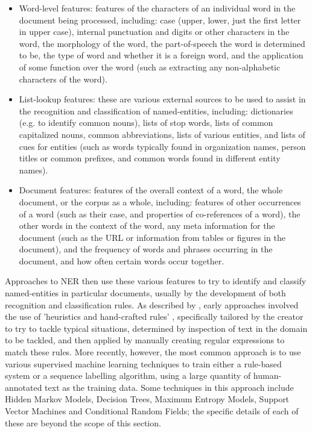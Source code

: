 \documentclass[12pt, a4paper]{report}
\begin{document}
\begin{itemize}
	\item {Word-level features: features of the characters of an individual word in the document being processed, including: case (upper, lower, just the first letter in upper case), internal punctuation and digits or other characters in the word, the morphology of the word, the part-of-speech the word is determined to be, the type of word and whether it is a foreign word, and the application of some function over the word (such as extracting any non-alphabetic characters of the word).}
	\item {List-lookup features: these are various external sources to be used to assist in the recognition and classification of named-entities, including: dictionaries (e.g. to identify common nouns), lists of stop words, lists of common capitalized nouns, common abbreviations, lists of various entities, and lists of cues for entities (such as words typically found in organization names, person titles or common prefixes, and common words found in different entity names).}
	\item {Document features: features of the overall context of a word, the whole document, or the corpus as a whole, including: features of other occurrences of a word (such as their case, and properties of co-references of a word), the other words in the context of the word, any meta information for the document (such as the URL or information from tables or figures in the document), and the frequency of words and phrases occurring in the document, and how often certain words occur together.}
\end{itemize}

Approaches to NER then use these various features to try to identify and classify named-entities in particular documents, usually by the  development of both recognition and classification rules. As described by \citet{nadeau2009}, early approaches involved the use of 'heuristics and hand-crafted rules' \citet[p.~2]{nadeau2009}, specifically tailored by the creator to try to tackle typical situations, determined by inspection of text in the domain to be tackled, and then applied by manually creating regular expressions to match these rules. More recently, however, the most common approach is to use various supervised machine learning techniques to train either a rule-based system or a sequence labelling algorithm, using a large quantity of human-annotated text as the training data. Some techniques in this approach include Hidden Markov Models, Decision Trees, Maximum Entropy Models, Support Vector Machines and Conditional Random Fields; the specific details of each of these are beyond the scope of this section. %
\end{document}
